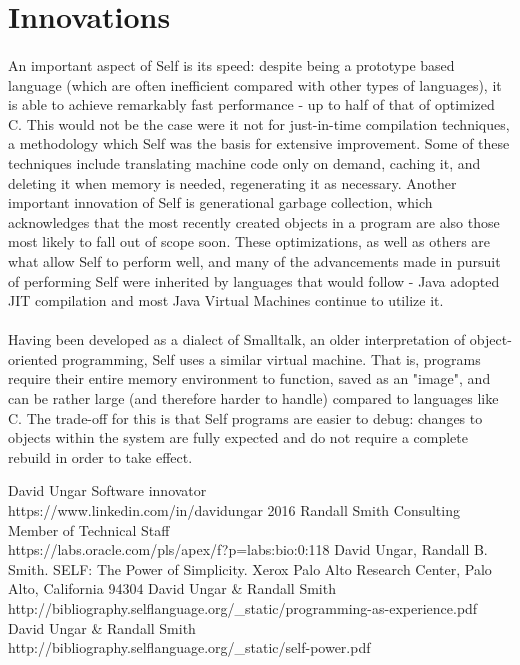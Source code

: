 \documentclass[12pt]{article}
\begin{document}
\section{Innovations}
\paragraph{} An important aspect of Self is its speed: despite being a prototype based language (which are often inefficient compared with other types of languages), it is able to achieve remarkably fast performance - up to half of that of optimized C. This would not be the case were it not for just-in-time compilation techniques, a methodology which Self was the basis for extensive improvement. Some of these techniques include translating machine code only on demand, caching it, and deleting it when memory is needed, regenerating it as necessary. Another important innovation of Self is generational garbage collection, which acknowledges that the most recently created objects in a program are also those most likely to fall out of scope soon. These optimizations, as well as others are what allow Self to perform well, and many of the advancements made in pursuit of performing Self were inherited by languages that would follow - Java adopted JIT compilation and most Java Virtual Machines continue to utilize it. 

\paragraph{} Having been developed as a dialect of Smalltalk, an older interpretation of object-oriented programming, Self uses a similar virtual machine. That is, programs require their entire memory environment to function, saved as an "image", and can be rather large (and therefore harder to handle) compared to languages like C. The trade-off for this is that Self programs are easier to debug: changes to objects within the system are fully expected and do not require a complete rebuild in order to take effect. 

\begin{thebibliography}{9}
 David Ungar Software innovator\\ https://www.linkedin.com/in/davidungar 2016
 Randall Smith Consulting Member of Technical Staff \\ https://labs.oracle.com/pls/apex/f?p=labs:bio:0:118
 David Ungar, Randall B. Smith. SELF: The Power of Simplicity. Xerox Palo Alto Research Center, Palo Alto, California 94304
 David Ungar & Randall Smith \\ http://bibliography.selflanguage.org/_static/programming-as-experience.pdf
 David Ungar & Randall Smith \\ http://bibliography.selflanguage.org/_static/self-power.pdf
\end{thebibliography}
\end{document}
